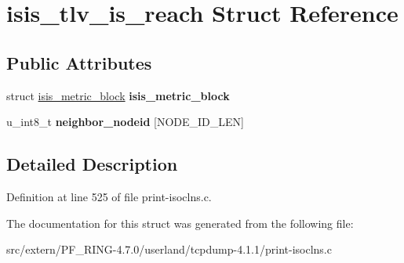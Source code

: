 \hypertarget{structisis__tlv__is__reach}{
\section{isis\_\-tlv\_\-is\_\-reach Struct Reference}
\label{structisis__tlv__is__reach}
}
\subsection*{Public Attributes}
\begin{DoxyCompactItemize}
\item 
\hypertarget{structisis__tlv__is__reach_a68e8191b4f9583369eb3f24b05ad985f}{
struct \hyperlink{structisis__metric__block}{isis\_\-metric\_\-block} {\bfseries isis\_\-metric\_\-block}}
\label{structisis__tlv__is__reach_a68e8191b4f9583369eb3f24b05ad985f}

\item 
\hypertarget{structisis__tlv__is__reach_af130e6e133654a6c716232e7a0c7b600}{
u\_\-int8\_\-t {\bfseries neighbor\_\-nodeid} \mbox{[}NODE\_\-ID\_\-LEN\mbox{]}}
\label{structisis__tlv__is__reach_af130e6e133654a6c716232e7a0c7b600}

\end{DoxyCompactItemize}


\subsection{Detailed Description}


Definition at line 525 of file print-\/isoclns.c.



The documentation for this struct was generated from the following file:\begin{DoxyCompactItemize}
\item 
src/extern/PF\_\-RING-\/4.7.0/userland/tcpdump-\/4.1.1/print-\/isoclns.c\end{DoxyCompactItemize}
